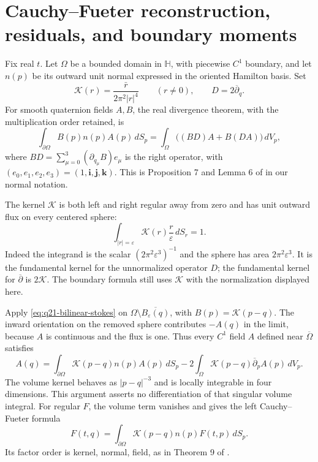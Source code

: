 \documentclass[11pt]{article}
\numberwithin{equation}{section}
\theoremstyle{definition}
\theoremstyle{remark}
\begin{document}
\section{Cauchy--Fueter reconstruction, residuals, and boundary moments}
\label{sec:q21-boundary-formulas}

Fix real \(t\). Let \(\Omega\) be a bounded domain in
\(\mathbb H\), with piecewise \(C^1\) boundary, and let \(n(p)\)
be its outward unit normal expressed in the oriented Hamilton basis.
Set
\begin{equation}
 \mathcal K(r)=\frac{\bar r}{2\pi^2|r|^4}
 \qquad(r\ne0),\qquad D=2\overline\partial_q.
 \label{eq:q21-cauchy-kernel}
\end{equation}
For smooth quaternion fields \(A,B\), the real divergence theorem,
with the multiplication order retained, is
\begin{equation}
 \int_{\partial\Omega}B(p)n(p)A(p)\,dS_p
 =\int_\Omega\bigl((B D)A+B(D A)\bigr)\,dV_p,
 \label{eq:q21-bilinear-stokes}
\end{equation}
where \(B D=\sum_{\mu=0}^3(\partial_{q_\mu}B)e_\mu\)
is the right operator, with
\((e_0,e_1,e_2,e_3)=(1,\mathbf i,\mathbf j,\mathbf k)\).
This is Proposition 7 and Lemma 6 of \cite{frenkellibine} in our
normal notation.

The kernel \(\mathcal K\) is both left and right regular away from
zero and has unit outward flux on every centered sphere:
\[
 \int_{|r|=\varepsilon}\mathcal K(r)\frac r\varepsilon\,dS_r=1.
\]
Indeed the integrand is the scalar \((2\pi^2\varepsilon^3)^{-1}\)
and the sphere has area \(2\pi^2\varepsilon^3\).
It is the fundamental kernel for the unnormalized operator \(D\);
the fundamental kernel for \(\overline\partial\) is
\(2\mathcal K\). The boundary formula still uses
\(\mathcal K\) with the normalization displayed here.

Apply \eqref{eq:q21-bilinear-stokes} on
\(\Omega\setminus\overline{B_\varepsilon(q)}\), with
\(B(p)=\mathcal K(p-q)\). The inward orientation on the removed
sphere contributes \(-A(q)\) in the limit, because \(A\) is
continuous and the flux is one. Thus every \(C^1\) field \(A\)
defined near \(\overline\Omega\) satisfies
\begin{equation}
 A(q)=\int_{\partial\Omega}\mathcal K(p-q)n(p)A(p)\,dS_p
       -2\int_\Omega\mathcal K(p-q)\overline\partial_pA(p)\,dV_p.
 \label{eq:q21-borel-pompeiu}
\end{equation}
The volume kernel behaves as \(|p-q|^{-3}\) and is locally
integrable in four dimensions. This argument asserts no differentiation
of that singular volume integral. For regular \(F\), the volume term
vanishes and gives the left Cauchy--Fueter formula
\begin{equation}
 F(t,q)=\int_{\partial\Omega}\mathcal K(p-q)n(p)F(t,p)\,dS_p.
 \label{eq:q21-cauchy-formula}
\end{equation}
Its factor order is kernel, normal, field, as in Theorem 9 of
\cite{frenkellibine}.
\end{document}
